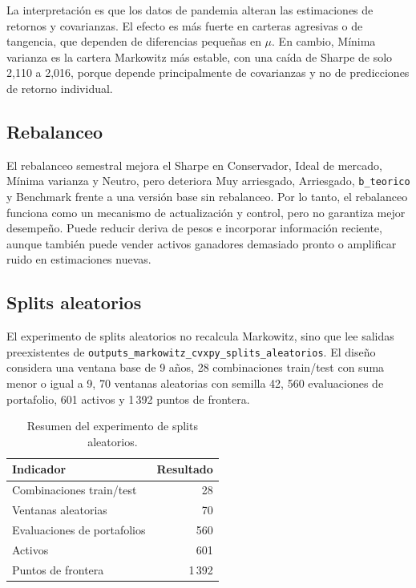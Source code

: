La interpretaci\'on es que los datos de pandemia alteran las estimaciones de
retornos y covarianzas. El efecto es m\'as fuerte en carteras agresivas o de
tangencia, que dependen de diferencias peque\~nas en $\mu$. En cambio, M\'inima
varianza es la cartera Markowitz m\'as estable, con una ca\'ida de Sharpe de solo
2,110 a 2,016, porque depende principalmente de covarianzas y no de
predicciones de retorno individual.

\subsection*{Rebalanceo}

El rebalanceo semestral mejora el Sharpe en Conservador, Ideal de mercado,
M\'inima varianza y Neutro, pero deteriora Muy arriesgado, Arriesgado,
\texttt{b\_teorico} y Benchmark frente a una versi\'on base sin rebalanceo. Por
lo tanto, el rebalanceo funciona como un mecanismo de actualizaci\'on y control,
pero no garantiza mejor desempe\~no. Puede reducir deriva de pesos e incorporar
informaci\'on reciente, aunque tambi\'en puede vender activos ganadores demasiado
pronto o amplificar ruido en estimaciones nuevas.

\subsection*{Splits aleatorios}

El experimento de splits aleatorios no recalcula Markowitz, sino que lee
salidas preexistentes de
\texttt{outputs\_markowitz\_cvxpy\_splits\_aleatorios}. El dise\~no considera
una ventana base de 9 a\~nos, 28 combinaciones train/test con suma menor o igual
a 9, 70 ventanas aleatorias con semilla 42, 560 evaluaciones de portafolio,
601 activos y 1\,392 puntos de frontera.

\begin{table}[H]
\centering
\caption{Resumen del experimento de splits aleatorios.}
\label{tab:anexo4_splits_resumen}
\small
\begin{tabular}{@{}lr@{}}
\toprule
Indicador & Resultado \\
\midrule
Combinaciones train/test & 28 \\
Ventanas aleatorias & 70 \\
Evaluaciones de portafolios & 560 \\
Activos & 601 \\
Puntos de frontera & 1\,392 \\
\bottomrule
\end{tabular}
\end{table}

